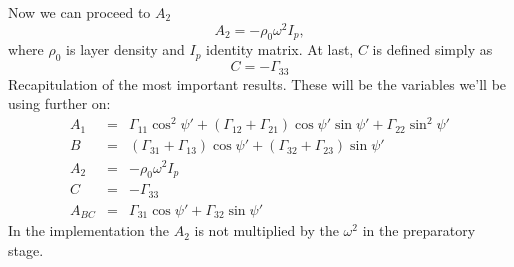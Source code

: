 \documentclass[12pt,a4paper]{article}
\begin{document}
Now we can proceed to $A_2$
\begin{equation}
	A_2 = -\rho_0 \omega^2 I_p,
\end{equation}
where $\rho_0$ is layer density and $I_p$ identity matrix. At last, $C$ is defined simply as
\begin{equation}
	C = -\Gamma_{33}
\end{equation}
Recapitulation of the most important results. These will be the variables we'll be using further on:
\begin{eqnarray}
	A_1 &=& \Gamma_{11}\cos^2{\psi'} + (\Gamma_{12}+\Gamma_{21})\cos{\psi'}\sin{\psi'} + \Gamma_{22}\sin^2{\psi'} \nonumber \\
	B 	&=& (\Gamma_{31} + \Gamma_{13}) \cos{\psi'} + (\Gamma_{32} + \Gamma_{23})\sin{\psi'} \nonumber \\
	A_2 &=& -\rho_0 \omega^2 I_p \nonumber \\
	C	&=& -\Gamma_{33} \nonumber \\
	A_{BC} &=&  \Gamma_{31} \cos{\psi'} + \Gamma_{32} \sin{\psi'} \nonumber
\end{eqnarray}
In the implementation the $A_2$ is not multiplied by the $\omega^2$ in the preparatory stage.
\end{document}
